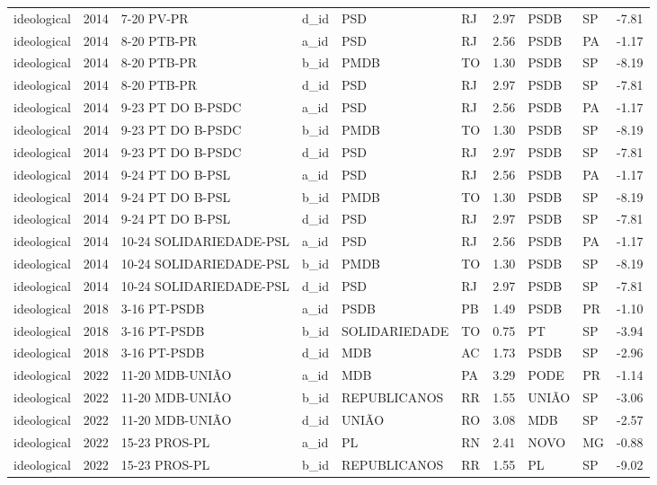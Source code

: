 \begin{landscape}
\begin{longtable}{lll l L{2.7cm}l r L{2.7cm}l r}
ideological & 2014 & 7-20 PV-PR & d\_id & PSD & RJ & 2.97 & PSDB & SP & -7.81 \\
ideological & 2014 & 8-20 PTB-PR & a\_id & PSD & RJ & 2.56 & PSDB & PA & -1.17 \\
ideological & 2014 & 8-20 PTB-PR & b\_id & PMDB & TO & 1.30 & PSDB & SP & -8.19 \\
ideological & 2014 & 8-20 PTB-PR & d\_id & PSD & RJ & 2.97 & PSDB & SP & -7.81 \\
ideological & 2014 & 9-23 PT DO B-PSDC & a\_id & PSD & RJ & 2.56 & PSDB & PA & -1.17 \\
ideological & 2014 & 9-23 PT DO B-PSDC & b\_id & PMDB & TO & 1.30 & PSDB & SP & -8.19 \\
ideological & 2014 & 9-23 PT DO B-PSDC & d\_id & PSD & RJ & 2.97 & PSDB & SP & -7.81 \\
ideological & 2014 & 9-24 PT DO B-PSL & a\_id & PSD & RJ & 2.56 & PSDB & PA & -1.17 \\
ideological & 2014 & 9-24 PT DO B-PSL & b\_id & PMDB & TO & 1.30 & PSDB & SP & -8.19 \\
ideological & 2014 & 9-24 PT DO B-PSL & d\_id & PSD & RJ & 2.97 & PSDB & SP & -7.81 \\
ideological & 2014 & 10-24 SOLIDARIEDADE-PSL & a\_id & PSD & RJ & 2.56 & PSDB & PA & -1.17 \\
ideological & 2014 & 10-24 SOLIDARIEDADE-PSL & b\_id & PMDB & TO & 1.30 & PSDB & SP & -8.19 \\
ideological & 2014 & 10-24 SOLIDARIEDADE-PSL & d\_id & PSD & RJ & 2.97 & PSDB & SP & -7.81 \\
ideological & 2018 & 3-16 PT-PSDB & a\_id & PSDB & PB & 1.49 & PSDB & PR & -1.10 \\
ideological & 2018 & 3-16 PT-PSDB & b\_id & SOLIDARIEDADE & TO & 0.75 & PT & SP & -3.94 \\
ideological & 2018 & 3-16 PT-PSDB & d\_id & MDB & AC & 1.73 & PSDB & SP & -2.96 \\
ideological & 2022 & 11-20 MDB-UNIÃO & a\_id & MDB & PA & 3.29 & PODE & PR & -1.14 \\
ideological & 2022 & 11-20 MDB-UNIÃO & b\_id & REPUBLICANOS & RR & 1.55 & UNIÃO & SP & -3.06 \\
ideological & 2022 & 11-20 MDB-UNIÃO & d\_id & UNIÃO & RO & 3.08 & MDB & SP & -2.57 \\
ideological & 2022 & 15-23 PROS-PL & a\_id & PL & RN & 2.41 & NOVO & MG & -0.88 \\
ideological & 2022 & 15-23 PROS-PL & b\_id & REPUBLICANOS & RR & 1.55 & PL & SP & -9.02 \\

\end{longtable}
\end{landscape}
